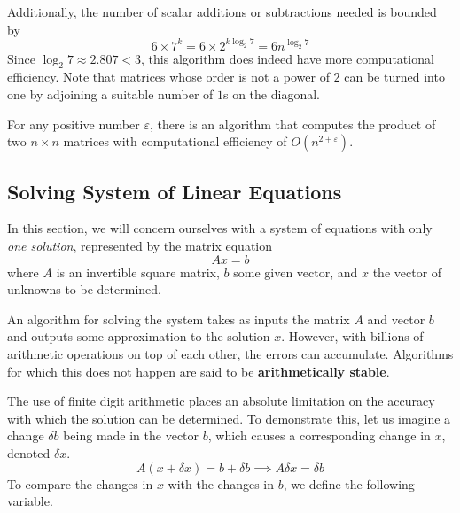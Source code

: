   Additionally, the number of scalar additions or subtractions needed is bounded by 
  \begin{equation}
    6 \times 7^k = 6 \times 2^{k \log_2{7}} = 6 n^{\log_2{7}}
  \end{equation}
  Since $\log_2{7} \approx 2.807 < 3$, this algorithm does indeed have more computational efficiency. Note that matrices whose order is not a power of $2$ can be turned into one by adjoining a suitable number of $1$s on the diagonal. 

  \begin{theorem}[Conjecture]
    For any positive number $\varepsilon$, there is an algorithm that computes the product of two $n \times n$ matrices with computational efficiency of $O(n^{2 + \varepsilon})$. 
  \end{theorem}

\subsection{Solving System of Linear Equations}

  In this section, we will concern ourselves with a system of equations with only \textit{one solution}, represented by the matrix equation
  \begin{equation}
    A x = b
  \end{equation}
  where $A$ is an invertible square matrix, $b$ some given vector, and $x$ the vector of unknowns to be determined. 

  An algorithm for solving the system takes as inputs the matrix $A$ and vector $b$ and outputs some approximation to the solution $x$. However, with billions of arithmetic operations on top of each other, the errors can accumulate. Algorithms for which this does not happen are said to be \textbf{arithmetically stable}. 

  The use of finite digit arithmetic places an absolute limitation on the accuracy with which the solution can be determined. To demonstrate this, let us imagine a change $\delta b$ being made in the vector $b$, which causes a corresponding change in $x$, denoted $\delta x$. 
  \begin{equation}
    A(x + \delta x) = b + \delta b \implies A \delta x = \delta b
  \end{equation}
  To compare the changes in $x$ with the changes in $b$, we define the following variable. 

